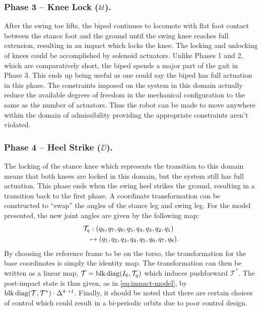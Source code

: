 \subsubsection{Phase 3 -- Knee Lock ($\mathit{kl}$).}
 
After the swing toe lifts, the biped continues to locomote with flat foot
contact between the stance foot and the ground until the swing knee reaches full
extension, resulting in an impact which locks the knee.
% 
The locking and unlocking of knees could be accomplished by solenoid actuators.
% 
Unlike Phases 1 and 2, which are comparatively short, the biped spends a major
part of the gait in Phase 3.
% 
This ends up being useful as one could say the biped has full actuation in this
phase.
% 
The constraints imposed on the system in this domain actually reduce the
available degrees of freedom in the mechanical configuration to the same as the
number of actuators.
% 
Thus the robot can be made to move anywhere within the domain of admissibility
providing the appropriate constraints aren't violated.

\subsubsection{Phase 4 -- Heel Strike ($\DD$).}
The locking of the stance knee which represents the transition to this domain
means that both knees are locked in this domain, but the system still has full
actuation.
% 
This phase ends when the swing heel strikes the ground, resulting in a
transition back to the first phase.
% 
A coordinate transformation can be constructed to ``swap'' the angles of the
stance leg and swing leg.
% 
For the model presented, the new joint angles are given by the following map:
% 
\begin{align*}
  \lefteqn{\mathcal{T}_q : (q_8, q_7, q_6, q_5, q_4, q_3, q_2, q_1)}\\
  && \mapsto (q_1, q_2, q_3, q_4, q_5, q_6, q_7, q_8).
\end{align*}
By choosing the reference frame to be on the torso, the transformation for the
base coordinates is simply the identity map.
% 
The transformation can then be written as a linear map, $\mathcal{T} =
\operatorname*{blk\,diag}(I_{6}, {\mathcal{T}_q})$ which induces pushforward $\mathcal{T}^*$.
% 
The post-impact state is thus given, as in \eqref{eq:impact-model}, by
$\operatorname*{blk\,diag}({\mathcal T}, {\mathcal T}^*) \cdot \Delta^{4 \to 1}$.
% 
Finally, it should be noted that there are certain choices of control which
could result in a bi-periodic orbits due to poor control design.

